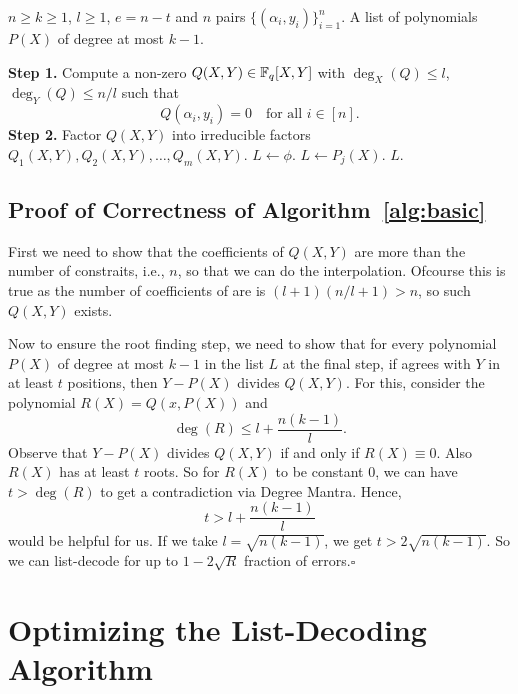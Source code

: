 \begin{algorithm}\label{alg:basic}
	\large
	\caption{\large Basic List-Decoding Algorithm for Reed-Solomon Codes}
	\begin{algorithmic}[1]
		\Input $n\geq k\geq 1$, $l\geq 1$, $e = n - t$ and $n$ pairs $\{(\alpha_i, y_i)\}_{i = 1}^n$.
		\Output A list of polynomials $P(X)$ of degree at most $k-1$.
		
		\State \textbf{Step 1.} Compute a non-zero $Q(X,Y)\in\mathbb{F}_q[X,Y]$ with $\deg_X(Q)\leq l$, $\deg_Y(Q)\leq n/l$ such that 
		\[
			Q(\alpha_i, y_i) = 0 \quad\text{for all $i\in[n]$}.
		\]
		\State \textbf{Step 2.} Factor $Q(X,Y)$ into irreducible factors $Q_1(X,Y), Q_2(X,Y), \ldots, Q_m(X,Y)$.
		\State $L \leftarrow \phi$.
				\State $L \leftarrow P_j(X)$.
			\EndIf
		\EndFor
		\State\Return $L$. 
	\end{algorithmic}
\end{algorithm}

\subsection*{Proof of Correctness of Algorithm~\ref{alg:basic}}
  First we need to show that the coefficients of $Q(X,Y)$ are more than the number of constraits, i.e., $n$, so that we can do the interpolation. Ofcourse this is true as the number of coefficients of are is $(l+1)(n/l+1)>n$, so such $Q(X,Y)$ exists. 
  
  Now to ensure the root finding step, we need to show that for every polynomial $P(X)$ of degree at most $k-1$ in the list $L$ at the final step, if agrees with $Y$ in at least $t$ positions, then $Y - P(X)$ divides $Q(X,Y)$. For this, consider the polynomial $R(X) = Q(x, P(X))$ and 
  \[
  \deg(R)\leq l + \frac{n(k-1)}{l}.
  \]
Observe that $Y - P(X)$ divides $Q(X,Y)$ if and only if $R(X)\equiv0$. Also $R(X)$ has at least $t$ roots. So for $R(X)$ to be constant 0, we can have $t>\deg(R)$ to get a contradiction via Degree Mantra. Hence,
\[
	t > l + \frac{n(k-1)}{l}
\]
would be helpful for us. If we take $l = \sqrt{n(k-1)}$, we get $t>2\sqrt{n(k-1)}$. So we can list-decode for up to $1 - 2\sqrt{R}$ fraction of errors.\hfill$\square$

\section{Optimizing the List-Decoding Algorithm}

